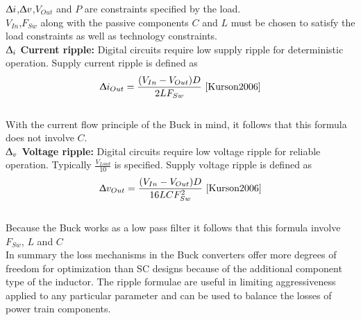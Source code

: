 \documentclass[letterpaper,twocolumn,10pt]{article}
\begin{document}
$\Updelta i$,$\Updelta v$,$V_{Out}$ and $P$ are constraints specified by the load.\\
$V_{In}$,$F_{Sw}$ along with the passive components $C$ and $L$ must be chosen to satisfy the load constraints as well as technology constraints.\\
\textbf{$\Updelta_i$ Current ripple: }Digital circuits require low supply ripple for deterministic operation. Supply current ripple is defined as\\
$$\Updelta i_{Out} = \frac{(V_{In} - V_{Out})D}{2LF_{Sw}} ~\cite{Kurson2006}$$ \\
With the current flow principle of the Buck in mind, it follows that this formula does not involve $C$.\\
\textbf{$\Updelta_v$ Voltage ripple: }Digital circuits require low voltage ripple for reliable operation. Typically $\frac{V_{Load}}{10}$ is specified. Supply voltage ripple is defined as\\
$$\Updelta v_{Out} = \frac{(V_{In} - V_{Out})D}{16LCF_{Sw}^2}  ~\cite{Kurson2006}$$\\
Because the Buck works as a low pass filter it follows that this formula involve $F_{Sw}$, $L$ and $C$\\

\indent In summary the loss mechanisms in the Buck converters offer more degrees of freedom for optimization than SC designs because of the additional component type of the inductor. The ripple formulae are useful in limiting aggressiveness applied to any particular parameter and can be used to balance the losses of power train components.
\end{document}
